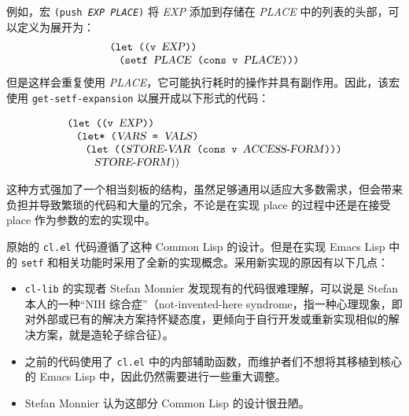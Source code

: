 \documentclass[format=acmsmall,screen]{acmart}
\makeatletter
\newcommand \MAlign [1] {\begin{array}{@{}l@{}}#1\end{array}}
\newcommand \id[1] {\textrm{\textsl{#1}}}
\makeatother
\begin{document}
例如，宏 \texttt{(push \id{EXP} \id{PLACE})} 将 \id{EXP} 添加到存储在 \id{PLACE} 中的列表的头部，可以定义为展开为：
%
\begin{displaymath}
  \MAlign{
    \texttt{(let ((v \id{EXP}))} \\
    \;\;\;\texttt{(setf \id{PLACE} (cons v \id{PLACE})))}}
\end{displaymath}
%
但是这样会重复使用 \id{PLACE}，它可能执行耗时的操作并具有副作用。因此，该宏使用 \texttt{get-setf-expansion} 以展开成以下形式的代码：

\begin{displaymath}
  \MAlign{
    \texttt{(let ((v \id{EXP}))} \\
    \;\;\;\MAlign{
      \texttt{(let* (\id{VARS} = \id{VALS})} \\
      \;\;\;\MAlign{
        \texttt{(let ((\id{STORE-VAR} (cons v \id{ACCESS-FORM})))} \\
        \;\;\;\id{STORE-FORM}))}}}
\end{displaymath}

这种方式强加了一个相当刻板的结构，虽然足够通用以适应大多数需求，但会带来负担并导致繁琐的代码和大量的冗余，不论是在实现 place 的过程中还是在接受 place 作为参数的宏的实现中。

原始的 \texttt{cl.el} 代码遵循了这种 Common Lisp 的设计。但是在实现 Emacs Lisp 中的 \texttt{setf} 和相关功能时采用了全新的实现概念。采用新实现的原因有以下几点：

\begin{itemize}
\item \texttt{cl-lib} 的实现者 Stefan Monnier 发现现有的代码很难理解，可以说是 Stefan 本人的一种“NIH 综合症”（not-invented-here syndrome，指一种心理现象，即对外部或已有的解决方案持怀疑态度，更倾向于自行开发或重新实现相似的解决方案，就是造轮子综合征）。
\item 之前的代码使用了 \texttt{cl.el} 中的内部辅助函数，而维护者们不想将其移植到核心的 Emacs Lisp 中，因此仍然需要进行一些重大调整。
\item Stefan Monnier 认为这部分 Common Lisp 的设计很丑陋。
\end{itemize}

\end{document}
